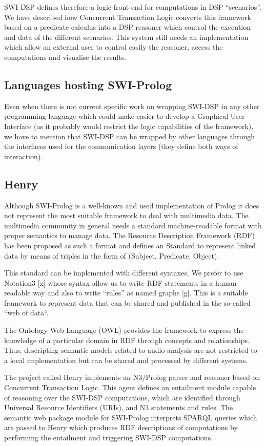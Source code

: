 \documentclass[runningheads]{llncs}
\begin{document}
SWI-DSP defines therefore a logic front-end for computations in DSP ``scenarios''. We have described how Concurrent Transaction Logic converts this framework based on a predicate calculus into a DSP reasoner which control the execution and data of the different scenarios. This system still needs an implementation which allow an external user to control easily the reasoner, access the computations and visualise the results.

\subsection{Languages hosting SWI-Prolog}

Even when there is not current specific work on wrapping SWI-DSP in any other programming language which could make easier to develop a Graphical User Interface (as it probably would restrict the logic capabilities of the framework), we have to mention that SWI-DSP can be wrapped by other languages through the interfaces used for the communication layers (they define both ways of interaction).

\subsection{Henry}\label{subsec:henry}

Although SWI-Prolog is a well-known and used implementation of Prolog it does not represent the most suitable framework to deal with multimedia data. The multimedia community in general needs a standard machine-readable format with proper semantics to manage data. The Resource Description Framework (RDF) has been proposed as such a format and defines an Standard to represent linked data by means of triples in the form of (Subject, Predicate, Object).

This standard can be implemented with different syntaxes. We prefer to use Notation3 [x] whose syntax allow us to write RDF statements in a human-readable way and also to write ``rules'' as named graphs [g]. This is a suitable framework to represent data that can be shared and published in the so-called ``web of data``.

The Ontology Web Language (OWL) provides the framework to express the knowledge of a particular domain in RDF through concepts and relationships. Thus, descripting semantic models related to audio analysis are not restricted to a local implementation but can be shared and processed by different systems.

The project called Henry implements an N3/Prolog parser and reasoner based on Concurrent Transaction Logic. This agent defines an entailment module capable of reasoning over the SWI-DSP computations, which are identified through Universal Resource Identifiers (URIs), and N3 statements and rules. The semantic web package module for SWI-Prolog interprets SPARQL queries which are passed to Henry which produces RDF descriptions of computations by performing the entailment and triggering SWI-DSP computations. 
\end{document}
